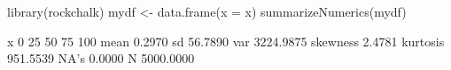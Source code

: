 \begin{Schunk}
\begin{Sinput}
  library(rockchalk)
  mydf <- data.frame(x = x)
  summarizeNumerics(mydf)
\end{Sinput}
\begin{Soutput}
                  x
0%       -2143.7651
25%         -1.0349
50%         -0.0002
75%          0.9759
100%      2038.5247
mean         0.2970
sd          56.7890
var       3224.9875
skewness     2.4781
kurtosis   951.5539
NA's         0.0000
N         5000.0000
\end{Soutput}
\end{Schunk}
